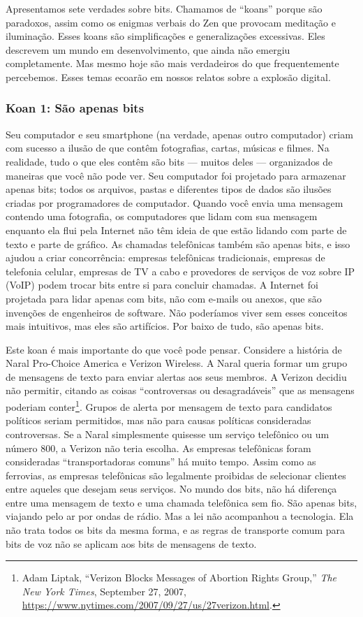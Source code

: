 Apresentamos sete verdades sobre bits. Chamamos de ``koans'' porque são
paradoxos, assim como os enigmas verbais do Zen que provocam meditação e
iluminação. Esses koans são simplificações e generalizações excessivas. Eles
descrevem um mundo em desenvolvimento, que ainda não emergiu completamente. Mas
mesmo hoje são mais verdadeiros do que frequentemente percebemos. Esses temas
ecoarão em nossos relatos sobre a explosão digital.


\subsubsection*{Koan 1: São apenas bits}
Seu computador e seu smartphone (na verdade, apenas outro computador) criam com 
sucesso a ilusão de que contêm fotografias, cartas, músicas e filmes. Na 
realidade, tudo o que eles contêm são bits --- muitos deles --- organizados de
maneiras que você não pode ver. Seu computador foi projetado para armazenar 
apenas bits; todos os arquivos, pastas e diferentes tipos de dados são ilusões 
criadas por programadores de computador. Quando você envia uma mensagem contendo 
uma fotografia, os computadores que lidam com sua mensagem enquanto ela flui 
pela Internet não têm ideia de que estão lidando com parte de texto e parte de 
gráfico. As chamadas telefônicas também são apenas bits, e isso ajudou a criar 
concorrência: empresas telefônicas tradicionais, empresas de telefonia celular, 
empresas de TV a cabo e provedores de serviços de voz sobre IP (VoIP) podem 
trocar bits entre si para concluir chamadas. A Internet foi projetada para lidar 
apenas com bits, não com e-mails ou anexos, que são invenções de engenheiros de 
software. Não poderíamos viver sem esses conceitos mais intuitivos, mas eles são 
artifícios. Por baixo de tudo, são apenas bits.

Este koan é mais importante do que você pode pensar. Considere a história de 
Naral Pro-Choice America e Verizon Wireless. A Naral queria formar um grupo de 
mensagens de texto para enviar alertas aos seus membros. A Verizon decidiu não 
permitir, citando as coisas ``controversas ou desagradáveis'' que as mensagens 
poderiam conter\footnote{Adam Liptak, ``Verizon Blocks Messages of Abortion
Rights Group,'' \textit{The New York Times}, September 27, 2007, \url{https://www.nytimes.com/2007/09/27/us/27verizon.html}.}. Grupos de alerta por mensagem de texto para candidatos 
políticos seriam permitidos, mas não para causas políticas consideradas 
controversas. Se a Naral simplesmente quisesse um serviço telefônico ou um 
número 800, a Verizon não teria escolha. As empresas telefônicas foram 
consideradas ``transportadoras comuns'' há muito tempo. Assim como as ferrovias, 
as empresas telefônicas são legalmente proibidas de selecionar clientes entre 
aqueles que desejam seus serviços. No mundo dos bits, não há diferença entre uma 
mensagem de texto e uma chamada telefônica sem fio. São apenas bits, viajando 
pelo ar por ondas de rádio. Mas a lei não acompanhou a tecnologia. Ela não 
trata todos os bits da mesma forma, e as regras de transporte comum para bits de 
voz não se aplicam aos bits de mensagens de texto.

